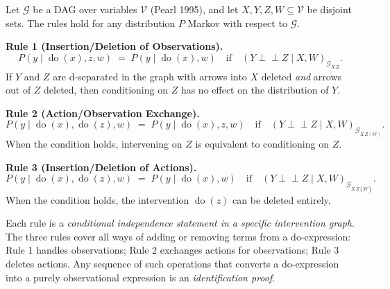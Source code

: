 \documentclass[
  a4paper,
]{book}
\newcommand{\doop}{\operatorname{do}}
\newcommand{\indep}{\perp\!\!\!\perp}
\newcommand{\Gcal}{\mathcal{G}}
\begin{document}
\begin{tcolorbox}[enhanced jigsaw, arc=.35mm, bottomrule=.15mm, bottomtitle=1mm, breakable, colback=white, colbacktitle=quarto-callout-tip-color!10!white, colframe=quarto-callout-tip-color-frame, coltitle=black, left=2mm, leftrule=.75mm, opacityback=0, opacitybacktitle=0.6, rightrule=.15mm, title={Theorem: The Three Rules of Do-Calculus}, titlerule=0mm, toprule=.15mm, toptitle=1mm]

Let \(\Gcal\) be a DAG over variables \(\mathcal{V}\) (Pearl 1995), and
let \(X, Y, Z, W \subseteq \mathcal{V}\) be disjoint sets. The rules
hold for any distribution \(P\) Markov with respect to \(\Gcal\).

\textbf{Rule 1 (Insertion/Deletion of Observations).}
\[P(y \mid \doop(x), z, w) \;=\; P(y \mid \doop(x), w) \quad\text{if}\quad (Y \indep Z \mid X, W)_{\Gcal_{\overline{X}\,\underline{Z}}}.\]
If \(Y\) and \(Z\) are d-separated in the graph with arrows into \(X\)
deleted \emph{and} arrows out of \(Z\) deleted, then conditioning on
\(Z\) has no effect on the distribution of \(Y\).

\textbf{Rule 2 (Action/Observation Exchange).}
\[P(y \mid \doop(x), \doop(z), w) \;=\; P(y \mid \doop(x), z, w) \quad\text{if}\quad (Y \indep Z \mid X, W)_{\Gcal_{\overline{X}\,\overline{Z(W)}}}.\]
When the condition holds, intervening on \(Z\) is equivalent to
conditioning on \(Z\).

\textbf{Rule 3 (Insertion/Deletion of Actions).}
\[P(y \mid \doop(x), \doop(z), w) \;=\; P(y \mid \doop(x), w) \quad\text{if}\quad (Y \indep Z \mid X, W)_{\Gcal_{\overline{X}\,\overline{Z(\overline{W})}}}.\]
When the condition holds, the intervention \(\doop(z)\) can be deleted
entirely.

\end{tcolorbox}

\begin{tcolorbox}[enhanced jigsaw, arc=.35mm, bottomrule=.15mm, bottomtitle=1mm, breakable, colback=white, colbacktitle=quarto-callout-note-color!10!white, colframe=quarto-callout-note-color-frame, coltitle=black, left=2mm, leftrule=.75mm, opacityback=0, opacitybacktitle=0.6, rightrule=.15mm, title={Remark}, titlerule=0mm, toprule=.15mm, toptitle=1mm]

Each rule is a \emph{conditional independence statement in a specific
intervention graph}. The three rules cover all ways of adding or
removing terms from a do-expression: Rule 1 handles observations; Rule 2
exchanges actions for observations; Rule 3 deletes actions. Any sequence
of such operations that converts a do-expression into a purely
observational expression is an \emph{identification proof}.

\end{tcolorbox}
\end{document}
